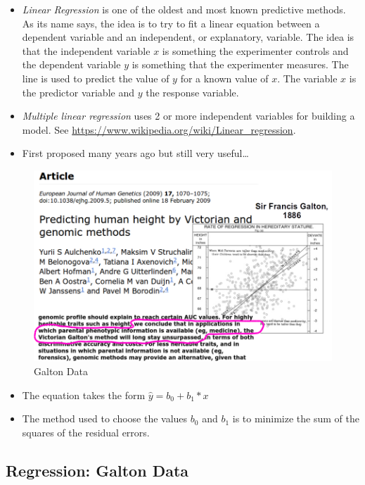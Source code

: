 \documentclass[]{book}
\providecommand{\tightlist}{%
  \setlength{\itemsep}{0pt}\setlength{\parskip}{0pt}}
\begin{document}
\begin{itemize}
\item
  \emph{Linear Regression} is one of the oldest and most known
  predictive methods. As its name says, the idea is to try to fit a
  linear equation between a dependent variable and an independent, or
  explanatory, variable. The idea is that the independent variable \(x\)
  is something the experimenter controls and the dependent variable
  \(y\) is something that the experimenter measures. The line is used to
  predict the value of \(y\) for a known value of \(x\). The variable
  \(x\) is the predictor variable and \(y\) the response variable.
\item
  \emph{Multiple linear regression} uses 2 or more independent variables
  for building a model. See
  \url{https://www.wikipedia.org/wiki/Linear_regression}.
\item
  First proposed many years ago but still very useful\ldots{}
\end{itemize}

\begin{figure}[htbp]
\centering
\includegraphics{figures/galton.png}
\caption{Galton Data}
\end{figure}

\begin{itemize}
\tightlist
\item
  The equation takes the form \(\hat{y}=b_0+b_1 * x\)
\item
  The method used to choose the values \(b_0\) and \(b_1\) is to
  minimize the sum of the squares of the residual errors.
\end{itemize}

\subsection{Regression: Galton Data}\label{regression-galton-data}
\end{document}
